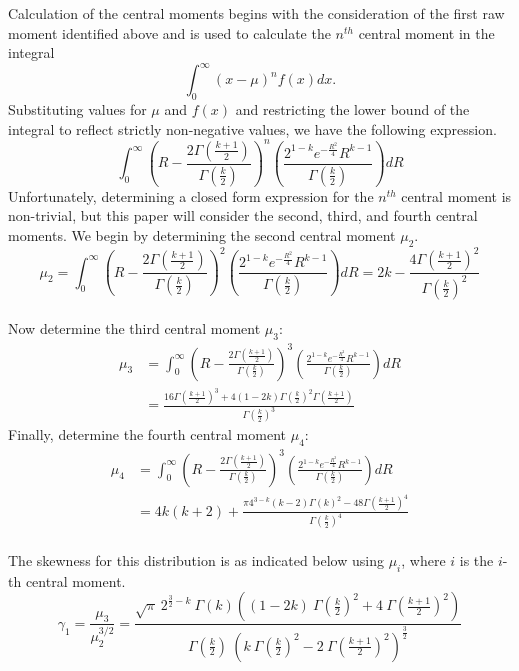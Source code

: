 \documentclass[11pt]{article} %
\begin{document}
\indent Calculation of the central moments begins with the consideration of the first raw moment identified above and is used to calculate the $n^{th}$ central moment in the integral
%
$$\int^\infty_0\left( x-\mu\right)^n f(x) dx.$$
%
\indent Substituting values for $\mu$ and $f(x)$ and restricting the lower bound of the integral to reflect strictly non-negative values, we have the following expression.
%
$$\int^\infty_0\left(R-\frac{2\Gamma\left(\frac{k+1}{2}\right)}{\Gamma\left(\frac{k}{2}\right)}\right)^n \left(\frac{2^{1-k}e^{-\frac{R^2}{4}}R^{k-1}}{\Gamma\left(\frac{k}{2}\right)}\right) dR$$
%
\indent Unfortunately, determining a closed form expression for the $n^{th}$ central moment is non-trivial, but this paper will consider the second, third, and fourth central moments.  We begin by determining the second central moment $\mu_2$. \\
%
$$\mu_2 = \int^\infty_0\left(R-\frac{2\Gamma\left(\frac{k+1}{2}\right)}{\Gamma\left(\frac{k}{2}\right)}\right)^2 \left(\frac{2^{1-k}e^{-\frac{R^2}{4}}R^{k-1}}{\Gamma\left(\frac{k}{2}\right)}\right) dR = 2k-\frac{4\Gamma\left(\frac{k+1}{2}\right)^2}{\Gamma\left(\frac{k}{2}\right)^2} $$
%
\\
\indent Now determine the third central moment $\mu_3$:
%
\begin{align*}\mu_3 &= \int^\infty_0\left(R-\frac{2\Gamma\left(\frac{k+1}{2}\right)}{\Gamma\left(\frac{k}{2}\right)}\right)^3 \left(\frac{2^{1-k}e^{-\frac{R^2}{4}}R^{k-1}}{\Gamma\left(\frac{k}{2}\right)}\right) dR \\
&= 
\frac{16\Gamma\left(\frac{k+1}{2}\right)^3 + 4(1-2k)\Gamma\left(\frac{k}{2}\right)^2\Gamma\left(\frac{k+1}{2}\right)}{\Gamma\left(\frac{k}{2}\right)^3}
\end{align*}
%
\indent Finally, determine the fourth central moment $\mu_4$:
%
\begin{align*}\mu_4 &= \int^\infty_0\left(R-\frac{2\Gamma\left(\frac{k+1}{2}\right)}{\Gamma\left(\frac{k}{2}\right)}\right)^3 \left(\frac{2^{1-k}e^{-\frac{R^2}{4}}R^{k-1}}{\Gamma\left(\frac{k}{2}\right)}\right) dR \\
&= 4k(k+2)+
\frac{\pi4^{3-k}(k-2)\Gamma\left(k\right)^2-48\Gamma\left(\frac{k+1}{2}\right)^4}
{\Gamma\left(\frac{k}{2}\right)^4} 
\end{align*}
%
\\
\indent The skewness for this distribution is as indicated below using $\mu_i$, where $i$ is the $i$-th central moment.
%
$$\gamma_1 = \frac{\mu_3}{\mu^{3/2}_2} = \frac{\sqrt{\pi} \ 2^{\frac{3}{2}-k } \ \Gamma(k)((1-2k) \ \Gamma(\frac{k}{2})^2+4 \ \Gamma(\frac{k+1}{2})^2)}{\Gamma(\frac{k}{2}) \ (k \ \Gamma(\frac{k}{2})^2 - 2 \ \Gamma(\frac{k+1}{2})^2)^\frac{3}{2}}$$
\end{document}
